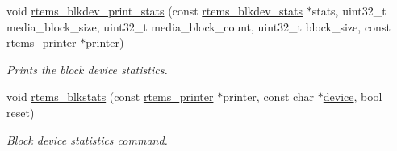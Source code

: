 \begin{DoxyCompactItemize}
void \mbox{\hyperlink{group__rtems__blkdev_gab318e4ab409ba1adb81fd6ad21314656}{rtems\+\_\+blkdev\+\_\+print\+\_\+stats}} (const \mbox{\hyperlink{structrtems__blkdev__stats}{rtems\+\_\+blkdev\+\_\+stats}} $\ast$stats, uint32\+\_\+t media\+\_\+block\+\_\+size, uint32\+\_\+t media\+\_\+block\+\_\+count, uint32\+\_\+t block\+\_\+size, const \mbox{\hyperlink{structrtems__printer}{rtems\+\_\+printer}} $\ast$printer)
\begin{DoxyCompactList}\small\item\em Prints the block device statistics. \end{DoxyCompactList}\item 
\mbox{\label{group__rtems__blkdev_gac171a347539842982856bb7b32dd4e76}} 
void \mbox{\hyperlink{group__rtems__blkdev_gac171a347539842982856bb7b32dd4e76}{rtems\+\_\+blkstats}} (const \mbox{\hyperlink{structrtems__printer}{rtems\+\_\+printer}} $\ast$printer, const char $\ast$\mbox{\hyperlink{structdevice}{device}}, bool reset)
\begin{DoxyCompactList}\small\item\em Block device statistics command. \end{DoxyCompactList}\end{DoxyCompactItemize}
